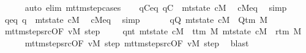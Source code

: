 \begin{isabellebody}
\ \ \ \ \isamarkupfalse%
\ {\isacharparenleft}{\kern0pt}auto\ elim{\isacharcolon}{\kern0pt}\ mttm{\isacharunderscore}{\kern0pt}step{\isachardot}{\kern0pt}cases{\isacharparenright}{\kern0pt}\isanewline
\ \ \isamarkupfalse%
\ qC{\isacharunderscore}{\kern0pt}eq{\isacharcolon}{\kern0pt}\ {\isachardoublequoteopen}qC\ {\isacharequal}{\kern0pt}\ mt{\isacharunderscore}{\kern0pt}state\ cM{\isachardoublequoteclose}\ \isamarkupfalse%
\ cM{\isacharunderscore}{\kern0pt}eq\ \isamarkupfalse%
\ simp\isanewline
\ \ \isamarkupfalse%
\ q{\isacharprime}{\kern0pt}{\isacharunderscore}{\kern0pt}eq{\isacharcolon}{\kern0pt}\ {\isachardoublequoteopen}q{\isacharprime}{\kern0pt}\ {\isacharequal}{\kern0pt}\ mt{\isacharunderscore}{\kern0pt}state\ cM{\isacharunderscore}{\kern0pt}{}{\isachardoublequoteclose}\ \isamarkupfalse%
\ cM{}{\isacharunderscore}{\kern0pt}eq\ \isamarkupfalse%
\ simp\isanewline
\ \ %
\isanewline
\ \ \isamarkupfalse%
\ qQ{\isacharcolon}{\kern0pt}\ {\isachardoublequoteopen}mt{\isacharunderscore}{\kern0pt}state\ cM\ {\isasymin}\ Q{\isacharunderscore}{\kern0pt}tm\ M{\isachardoublequoteclose}\ \isamarkupfalse%
\ mttm{\isacharunderscore}{\kern0pt}step{\isacharunderscore}{\kern0pt}src{\isacharparenleft}{\kern0pt}{}{\isacharparenright}{\kern0pt}{\isacharbrackleft}{\kern0pt}OF\ vM\ step{\isacharbrackright}{\kern0pt}\ \isakeywordONE{{\isachardot}{\kern0pt}}\isamarkupfalse%
\isanewline
\ \ \isamarkupfalse%
\ qnt{\isacharcolon}{\kern0pt}\ {\isachardoublequoteopen}mt{\isacharunderscore}{\kern0pt}state\ cM\ {\isasymnoteq}\ t{\isacharunderscore}{\kern0pt}tm\ M{\isachardoublequoteclose}\ {\isachardoublequoteopen}mt{\isacharunderscore}{\kern0pt}state\ cM\ {\isasymnoteq}\ r{\isacharunderscore}{\kern0pt}tm\ M{\isachardoublequoteclose}\isanewline
\ \ \ \ \isamarkupfalse%
\ mttm{\isacharunderscore}{\kern0pt}step{\isacharunderscore}{\kern0pt}src{\isacharparenleft}{\kern0pt}{}{\isacharparenright}{\kern0pt}{\isacharbrackleft}{\kern0pt}OF\ vM\ step{\isacharbrackright}{\kern0pt}\ mttm{\isacharunderscore}{\kern0pt}step{\isacharunderscore}{\kern0pt}src{\isacharparenleft}{\kern0pt}{}{\isacharparenright}{\kern0pt}{\isacharbrackleft}{\kern0pt}OF\ vM\ step{\isacharbrackright}{\kern0pt}\ \isamarkupfalse%
\ blast{\isacharplus}{\kern0pt}\isanewline

\end{isabellebody}
